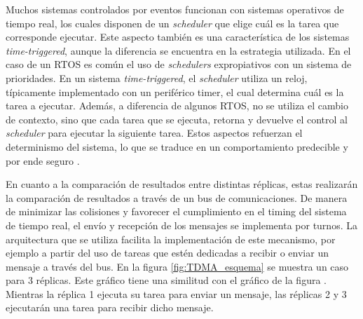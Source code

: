 Muchos sistemas controlados por eventos funcionan con sistemas operativos de tiempo real, los cuales disponen de un \textit{scheduler} que elige cuál es la tarea que corresponde ejecutar. Este aspecto también es una característica de los sistemas \textit{time-triggered}, aunque la diferencia se encuentra en la estrategia utilizada. En el caso de un RTOS es común el uso de \textit{schedulers} expropiativos con un sistema de prioridades. En un sistema \textit{time-triggered}, el \textit{scheduler} utiliza un reloj, típicamente implementado con un periférico timer, el cual determina cuál es la tarea a ejecutar. Además, a diferencia de algunos RTOS, no se utiliza el cambio de contexto, sino que cada tarea que se ejecuta, retorna y devuelve el control al \textit{scheduler} para ejecutar la siguiente tarea. Estos aspectos refuerzan el determinismo del sistema, lo que se traduce en un comportamiento predecible y por ende seguro \cite[p.~247]{pont2008patterns}.






En cuanto a la comparación de resultados entre distintas réplicas, estas realizarán la comparación de resultados a través de un bus de comunicaciones. %
De manera de minimizar las colisiones y favorecer el cumplimiento en el timing del sistema de tiempo real, el envío y recepción de los mensajes se implementa por turnos. La arquitectura que se utiliza facilita la implementación de este mecanismo, por ejemplo a partir del uso de tareas que estén dedicadas a recibir o enviar un mensaje a través del bus. %
En la figura \ref{fig:TDMA_esquema} se muestra un caso para 3 réplicas. Este gráfico tiene una similitud con el gráfico de la figura . Mientras la réplica 1 ejecuta su tarea para enviar un mensaje, las réplicas 2 y 3 ejecutarán una tarea para recibir dicho mensaje. 

